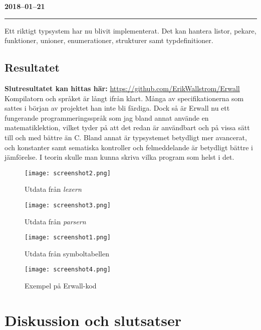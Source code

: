 \documentclass{theme}
\begin{document}
\noindent\textbf{2018--01--21}\\
\noindent\rule{\textwidth}{1pt}

\noindent
Ett riktigt typsystem har nu blivit implementerat. Det kan hantera listor,
pekare, funktioner, unioner, enumerationer, strukturer samt typdefinitioner.\\

\subsection{Resultatet}

\noindent\textbf{Slutresultatet kan hittas här: }
\url{https://github.com/ErikWallstrom/Erwall}\\

\noindent Kompilatorn och språket är långt ifrån klart. Många av
specifikationerna som sattes i början av projektet han inte bli färdiga. Dock så
är Erwall nu ett fungerande programmeringsspråk som jag bland annat använde en
matematiklektion, vilket tyder på att det redan är användbart och på vissa sätt
till och med bättre än C. Bland annat är typsystemet betydligt mer avancerat,
och konstanter samt sematiska kontroller och felmeddelande är betydligt bättre i
jämförelse. I teorin skulle man kunna skriva vilka program som helst i det.\\

\begin{figure}
	\centering
	\texttt{[image: screenshot2.png]}
	\caption{Utdata från \textit{lexern}}
\end{figure}

\begin{figure}
	\centering
	\texttt{[image: screenshot3.png]}
	\caption{Utdata från \textit{parsern}}
\end{figure}

\begin{figure}
	\centering
	\texttt{[image: screenshot1.png]}
	\caption{Utdata från symboltabellen}
\end{figure}

\begin{figure}
	\centering
	\texttt{[image: screenshot4.png]}
	\caption{Exempel på Erwall-kod}
\end{figure}

\section{Diskussion och slutsatser}
\end{document}
